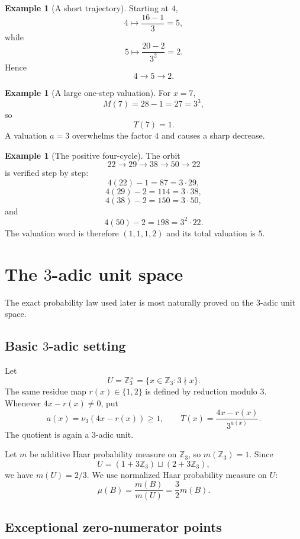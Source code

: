 \documentclass[11pt]{article}
\theoremstyle{definition}
\newtheorem{example}[theorem]{Example}
\theoremstyle{remark}
\newcommand{\vthree}{\nu_3}
\newcommand{\Zthree}{\mathbb Z_3}
\begin{document}
\begin{example}[A short trajectory]
Starting at $4$,
\[
4\mapsto\frac{16-1}{3}=5,
\]
while
\[
5\mapsto\frac{20-2}{3^2}=2.
\]
Hence
\[
4\to5\to2.
\]
\end{example}

\begin{example}[A large one-step valuation]
For $x=7$,
\[
M(7)=28-1=27=3^3,
\]
so
\[
T(7)=1.
\]
A valuation $a=3$ overwhelms the factor $4$ and causes a sharp decrease.
\end{example}

\begin{example}[The positive four-cycle]
The orbit
\[
22\to29\to38\to50\to22
\]
is verified step by step:
\[
4(22)-1=87=3\cdot29,
\]
\[
4(29)-2=114=3\cdot38,
\]
\[
4(38)-2=150=3\cdot50,
\]
and
\[
4(50)-2=198=3^2\cdot22.
\]
The valuation word is therefore $(1,1,1,2)$ and its total valuation is $5$.
\end{example}

\section{The \texorpdfstring{$3$}{3}-adic unit space}

The exact probability law used later is most naturally proved on the $3$-adic unit space.

\subsection{Basic \texorpdfstring{$3$}{3}-adic setting}

Let
\[
U=\Zthree^\times=\{x\in\Zthree:3\nmid x\}.
\]
The same residue map $r(x)\in\{1,2\}$ is defined by reduction modulo $3$.
Whenever $4x-r(x)\ne0$, put
\[
a(x)=\vthree(4x-r(x))\ge1,
\qquad
T(x)=\frac{4x-r(x)}{3^{a(x)}}.
\]
The quotient is again a $3$-adic unit.

Let $m$ be additive Haar probability measure on $\Zthree$, so $m(\Zthree)=1$.  Since
\[
U=(1+3\Zthree)\sqcup(2+3\Zthree),
\]
we have $m(U)=2/3$.  We use normalized Haar probability measure on $U$:
\begin{equation}
\mu(B)=\frac{m(B)}{m(U)}=\frac32m(B).
\label{eq:normalized-haar}
\end{equation}

\subsection{Exceptional zero-numerator points}
\end{document}
